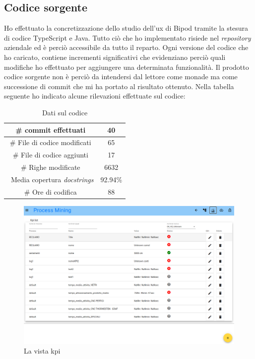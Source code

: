 \subsection{Codice sorgente}
Ho effettuato la concretizzazione dello studio dell'\acrshort{ux} di Bipod tramite la stesura di codice TypeScript e Java. Tutto ciò che ho implementato risiede nel \textit{repository} aziendale ed è perciò accessibile da tutto il reparto. Ogni versione del codice che ho caricato, contiene incrementi significativi che evidenziano perciò quali modifiche ho effettuato per aggiungere una determinata funzionalità. Il prodotto codice sorgente non è perciò da intendersi dal lettore come monade ma come successione di \gls{commit} che mi ha portato al risultato ottenuto.
Nella tabella seguente ho indicato alcune rilevazioni effettuate sul codice:
\begin{table}[H]
    \centering
    \begin{tabular}{|c|c|}
    \hline
        \# commit effettuati & 40 \\ \hline
        \# File di codice modificati & 65 \\ \hline
        \# File di codice aggiunti & 17 \\ \hline
        \# Righe modificate & 6632 \\ \hline
        \ Media copertura \textit{docstrings} & 92.94\% \\ \hline
        \# Ore di codifica & 88 \\ \hline
    \end{tabular}
    \caption{Dati sul codice}
    \label{tab:codeData}
\end{table}
\begin{figure}[H]
    \centering
    \includegraphics[width=\columnwidth]{immagini/immagine di prodotto.png}
    \caption{La vista \acrshort{kpi}}
    \label{fig:kpiView}
\end{figure}
